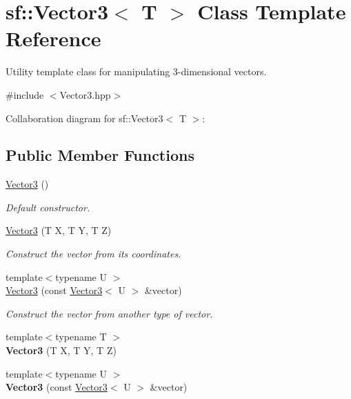 \hypertarget{classsf_1_1_vector3}{}\section{sf\+:\+:Vector3$<$ T $>$ Class Template Reference}
\label{classsf_1_1_vector3}


Utility template class for manipulating 3-\/dimensional vectors.  




{\ttfamily \#include $<$Vector3.\+hpp$>$}



Collaboration diagram for sf\+:\+:Vector3$<$ T $>$\+:
\subsection*{Public Member Functions}
\begin{DoxyCompactItemize}
\item 
\hyperlink{classsf_1_1_vector3_aee8be1985c6e45e381ad4071265636f9}{Vector3} ()
\begin{DoxyCompactList}\small\item\em Default constructor. \end{DoxyCompactList}\item 
\hyperlink{classsf_1_1_vector3_a99ed75b68f58adfa3e9fa0561b424bf6}{Vector3} (T X, T Y, T Z)
\begin{DoxyCompactList}\small\item\em Construct the vector from its coordinates. \end{DoxyCompactList}\item 
{\footnotesize template$<$typename U $>$ }\\\hyperlink{classsf_1_1_vector3_adb2b2e150025e97ccfa96219bbed59d1}{Vector3} (const \hyperlink{classsf_1_1_vector3}{Vector3}$<$ U $>$ \&vector)
\begin{DoxyCompactList}\small\item\em Construct the vector from another type of vector. \end{DoxyCompactList}\item 
\mbox{\label{classsf_1_1_vector3_a6d71676baa113af029006c01620fd4ca}} 
{\footnotesize template$<$typename T $>$ }\\{\bfseries Vector3} (T X, T Y, T Z)
\item 
\mbox{\label{classsf_1_1_vector3_adb2b2e150025e97ccfa96219bbed59d1}} 
{\footnotesize template$<$typename U $>$ }\\{\bfseries Vector3} (const \hyperlink{classsf_1_1_vector3}{Vector3}$<$ U $>$ \&vector)
\end{DoxyCompactItemize}
